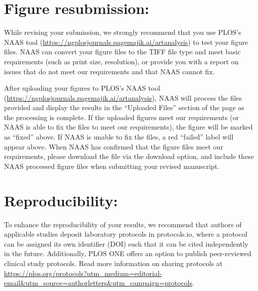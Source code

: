 \documentclass[a4paper, 11pt]{article}
\begin{document}
\section*{Figure resubmission:}

While revising your submission, we strongly recommend that you use PLOS's NAAS tool (\url{https://ngplosjournals.pagemajik.ai/artanalysis}) to test your figure files. NAAS can convert your figure files to the TIFF file type and meet basic requirements (such as print size, resolution), or provide you with a report on issues that do not meet our requirements and that NAAS cannot fix.

After uploading your figures to PLOS's NAAS tool (\url{https://ngplosjournals.pagemajik.ai/artanalysis}), NAAS will process the files provided and display the results in the ``Uploaded Files'' section of the page as the processing is complete. If the uploaded figures meet our requirements (or NAAS is able to fix the files to meet our requirements), the figure will be marked as ``fixed'' above. If NAAS is unable to fix the files, a red ``failed'' label will appear above. When NAAS has confirmed that the figure files meet our requirements, please download the file via the download option, and include these NAAS processed figure files when submitting your revised manuscript.

\section*{Reproducibility:}

To enhance the reproducibility of your results, we recommend that authors of applicable studies deposit laboratory protocols in protocols.io, where a protocol can be assigned its own identifier (DOI) such that it can be cited independently in the future. Additionally, PLOS ONE offers an option to publish peer-reviewed clinical study protocols. Read more information on sharing protocols at \url{https://plos.org/protocols?utm_medium=editorial-email&utm_source=authorletters&utm_campaign=protocols}.
\end{document}
